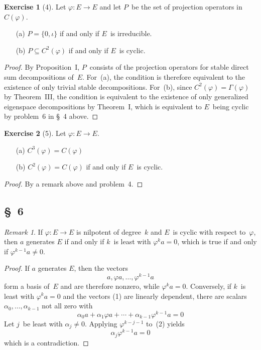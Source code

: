\documentclass[letterpaper,12pt]{article}
\theoremstyle{definition}
\newtheorem*{exer}{Exercise}
\theoremstyle{remark}
\newtheorem*{rmk}{Remark}
\begin{document}
\begin{exer}[4]
Let \(\varphi:E\to E\) and let \(P\)~be the set of projection operators in~\(C(\varphi)\).
\begin{enumerate}
\item[(a)] \(P=\{0,\iota\}\) if and only if \(E\)~is irreducible.
\item[(b)] \(P\subseteq C^2(\varphi)\) if and only if \(E\)~is cyclic.
\end{enumerate}
\end{exer}
\begin{proof}
By Proposition~I, \(P\)~consists of the projection operators for stable direct sum decompositions of~\(E\). For~(a), the condition is therefore equivalent to the existence of only trivial stable decompositions. For~(b), since \(C^2(\varphi)=\Gamma(\varphi)\) by Theorem~III, the condition is equivalent to the existence of only generalized eigenspace decompositions by Theorem~I, which is equivalent to \(E\)~being cyclic by problem~6 in \S~4 above.
\end{proof}

\begin{exer}[5]
Let \(\varphi:E\to E\).
\begin{enumerate}
\item[(a)] \(C^3(\varphi)=C(\varphi)\)
\item[(b)] \(C^2(\varphi)=C(\varphi)\) if and only if \(E\)~is cyclic.
\end{enumerate}
\end{exer}
\begin{proof}
By a remark above and problem~4.
\end{proof}

\subsection*{\S~6}
\begin{rmk}
If \(\varphi:E\to E\) is nilpotent of degree~\(k\) and \(E\)~is cyclic with respect to~\(\varphi\), then \(a\) generates \(E\) if and only if \(k\)~is least with \(\varphi^k a=0\), which is true if and only if \(\varphi^{k-1}a\ne 0\).
\end{rmk}
\begin{proof}
If \(a\) generates \(E\), then the vectors
\[a,\varphi a,\ldots,\varphi^{k-1}a\tag{1}\]
form a basis of~\(E\) and are therefore nonzero, while \(\varphi^k a=0\). Conversely, if \(k\)~is least with \(\varphi^k a=0\) and the vectors (1) are linearly dependent, there are scalars \(\alpha_0,\ldots,\alpha_{k-1}\) not all zero with
\[\alpha_0a+\alpha_1\varphi a+\cdots+\alpha_{k-1}\varphi^{k-1}a=0\tag{2}\]
Let \(j\)~be least with \(\alpha_j\ne 0\). Applying \(\varphi^{k-j-1}\) to~(2) yields
\[\alpha_j\varphi^{k-1}a=0\]
which is a contradiction.
\end{proof}
\end{document}
